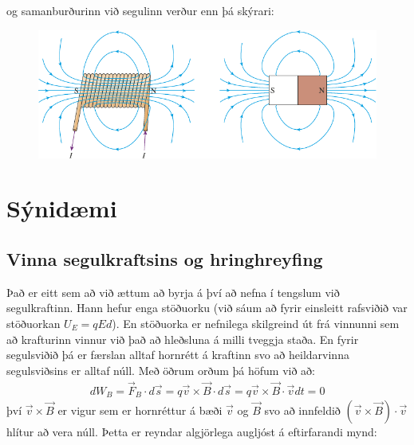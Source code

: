 \ifdefined \wholebook \else\documentclass[oneside]{book}\usepackage{EdlBook}\graphicspath{{figures/}}
\begin{document}
og samanburðurinn við segulinn verður enn þá skýrari:

\begin{figure}[H]
    \centering
    \includegraphics[scale = 0.8]{figures/segull2.pdf}
\end{figure}

\newpage

\section*{Sýnidæmi}

\subsection*{Vinna segulkraftsins og hringhreyfing}

Það er eitt sem að við ættum að byrja á því að nefna í tengslum við segulkraftinn. Hann hefur enga stöðuorku (við sáum að fyrir einsleitt rafsviðið var stöðuorkan $U_E = qEd$). En stöðuorka er nefnilega skilgreind út frá vinnunni sem að krafturinn vinnur við það að hleðsluna á milli tveggja staða. En fyrir segulsviðið þá er færslan alltaf hornrétt á kraftinn svo að heildarvinna segulsviðsins er alltaf núll. Með öðrum orðum þá höfum við að:
\begin{align*}
    dW_{B} = \vec{F}_B \cdot d\vec{s} = q \vec{v} \times \vec{B} \cdot  d\vec{s}  = q \vec{v} \times \vec{B} \cdot \vec{v}dt = 0
\end{align*}
því $\vec{v} \times \vec{B}$ er vigur sem er hornréttur á bæði $\vec{v}$ og $\vec{B}$ svo að innfeldið $(\vec{v} \times \vec{B}) \cdot \vec{v}$ hlítur að vera núll. Þetta er reyndar algjörlega augljóst á eftirfarandi mynd:
\end{document}
